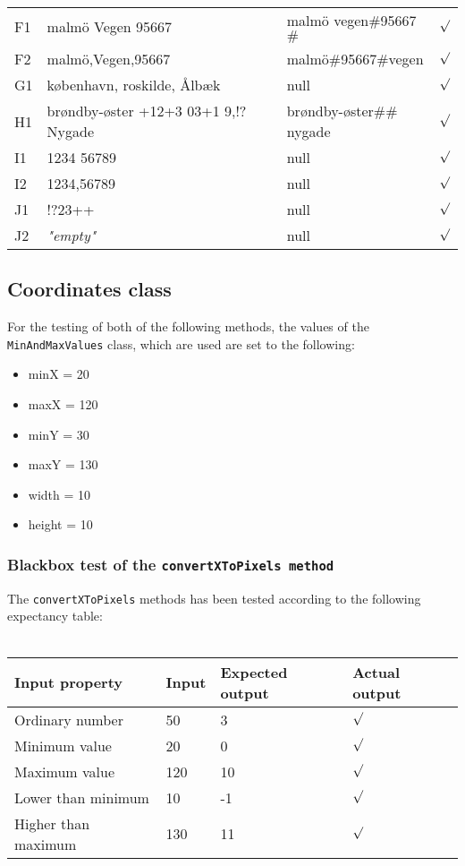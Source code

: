 \documentclass[a4paper,11pt]{article}
\begin{document}
\begin{tabular}{ p{1cm} | p{5cm} | p{5cm} | p{1cm} }
	F1 & malm\"{o} Vegen 95667 & malm\"{o} vegen$\#$95667$\#$ & $\surd$ \\
	F2 & malm\"{o},Vegen,95667 & malm\"{o}$\#$95667$\#$vegen & $\surd$ \\
	G1 & k\o benhavn, roskilde, \AA lb\ae k & null & $\surd$ \\
	H1 & br\o ndby-\o ster +12+3 03+1 9,!?Nygade & br\o ndby-\o ster$\#\#$nygade & $\surd$ \\
	I1 & 1234 56789 & null & $\surd$ \\
	I2 & 1234,56789 & null & $\surd$ \\
	J1 & !?23++ & null & $\surd$ \\
	J2 & \textsl{"empty"} & null & $\surd$
\end{tabular}

\pagebreak
\subsection{Coordinates class}
For the testing of both of the following methods, the values of the \texttt{MinAndMaxValues} class, which are used are set to the following:
\begin{itemize}
	\item minX = 20
	\item maxX = 120
	\item minY = 30
	\item maxY = 130
	\item width = 10
	\item height = 10
\end{itemize}

\subsubsection{Blackbox test of the \texttt{convertXToPixels method}}
The \texttt{convertXToPixels} methods has been tested according to the following expectancy table: \\ \\
\begin{tabular}{ p{3.5cm} | p{2.5cm} | p{2.5cm} | p{2.5cm} }
	Input property & Input & Expected output & Actual output \\
	\hline
	Ordinary number & 50 & 3 & $\surd$ \\
	Minimum value & 20 & 0 & $\surd$ \\
	Maximum value & 120 & 10 & $\surd$ \\
	Lower than minimum & 10 & -1 & $\surd$ \\
	Higher than maximum & 130 & 11 & $\surd$
\end{tabular}
\end{document}
